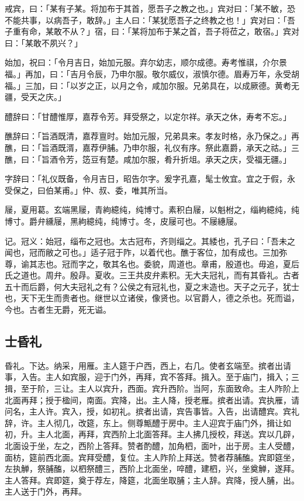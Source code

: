 \documentclass[]{article}
\begin{document}
戒宾，曰：「某有子某。将加布于其首，愿吾子之教之也。」宾对曰：「某不敏，恐不能共事，以病吾子，敢辞。」主人曰：「某犹愿吾子之终教之也！」宾对曰：「吾子重有命，某敢不从？」宿，曰：「某将加布于某之首，吾子将莅之，敢宿。」宾对曰：「某敢不夙兴？」

始加，祝曰：「令月吉日，始加元服。弃尔幼志，顺尔成德。寿考惟祺，介尔景福。」再加，曰：「吉月令辰，乃申尔服。敬尔威仪，淑慎尔德。眉寿万年，永受胡福。」三加，曰：「以岁之正，以月之令，咸加尔服。兄弟具在，以成厥德。黄耇无疆，受天之庆。」

醴辞曰：「甘醴惟厚，嘉荐令芳。拜受祭之，以定尔祥。承天之休，寿考不忘。」

醮辞曰：「旨酒既清，嘉荐亶时。始加元服，兄弟具来。孝友时格，永乃保之。」再醮，曰：「旨酒既湑，嘉荐伊脯。乃申尔服，礼仪有序。祭此嘉爵，承天之祜。」三醮，曰：「旨酒令芳，笾豆有楚。咸加尔服，肴升折俎。承天之庆，受福无疆。」

字辞曰：「礼仪既备，令月吉日，昭告尔字。爰字孔嘉，髦士攸宜。宜之于假，永受保之，曰伯某甫。」仲、叔、委，唯其所当。

屦，夏用葛。玄端黑屦，青絇繶纯，纯博寸。素积白屦，以魁柎之，缁絇繶纯，纯博寸。爵弁纁屦，黑絇繶纯，纯博寸。冬，皮屦可也。不屦繐屦。

记。冠义：始冠，缁布之冠也。太古冠布，齐则缁之。其緌也，孔子曰：「吾未之闻也，冠而敝之可也。」适子冠于阼，以着代也。醮于客位，加有成也。三加弥尊，谕其志也。冠而字之，敬其名也。委貌，周道也。章甫，殷道也。毋追，夏后氏之道也。周弁。殷冔。夏收。三王共皮弁素积。无大夫冠礼，而有其昏礼。古者五十而后爵，何大夫冠礼之有？公侯之有冠礼也，夏之末造也。天子之元子，犹士也，天下无生而贵者也。继世以立诸侯，像贤也。以官爵人，德之杀也。死而谥，今也。古者生无爵，死无谥。

\hypertarget{header-n16}{%
\subsection{士昏礼}\label{header-n16}}

昏礼。下达。纳采，用雁。主人筵于户西，西上，右几。使者玄端至。摈者出请事，入告。主人如宾服，迎于门外，再拜，宾不答拜。揖入。至于庙门，揖入；三揖，至于阶，三让。主人以宾升，西面。宾升西阶。当阿，东面致命。主人阼阶上北面再拜；授于楹间，南面。宾降，出。主人降，授老雁。摈者出请。宾执雁，请问名，主人许。宾入，授，如初礼。摈者出请，宾告事皆。入告，出请醴宾。宾礼辞，许。主人彻几，改筵，东上。侧尊甒醴于房中。主人迎宾于庙门外，揖让如初，升。主人北面，再拜，宾西阶上北面答拜。主人拂几授校，拜送。宾以几辟，北面设于坐，左之，西阶上答拜。赞者酌醴，加角柶，面叶，出于房。主人受醴，面枋，筵前西北面。宾拜受醴，复位。主人阼阶上拜送。赞者荐脯醢。宾即筵坐，左执觯，祭脯醢，以柶祭醴三，西阶上北面坐，啐醴，建柶，兴，坐奠觯，遂拜。主人答拜。宾即筵，奠于荐左，降筵，北面坐取脯；主人辞。宾降，授人脯，出。主人送于门外，再拜。
\end{document}
